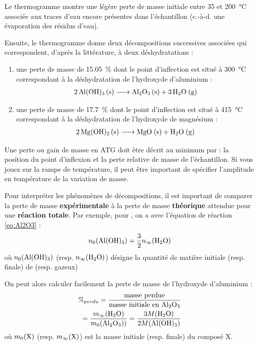 \documentclass[twoside,a4paper,11pt,addpoints,answers]{exam}%
\begin{document}
Le thermogramme montre une légère perte de masse initiale entre 35 et \SI{200}{\celsius} associée aux traces d'eau encore présentes dans l'échantillon (c.-à-d. une évaporation des résidus d'eau).

Ensuite, le thermogramme donne deux décompositions successives associées qui correspondent, d'après la littérature, à deux déshydratations : 
\begin{enumerate}
\item une perte de masse de \SI{15.05}{\percent} dont le point d'inflection est situé à \SI{300}{\celsius} correspondant à la déshydratation de l'hydroxyde d'aluminium : 
\begin{align}
\ce{2 Al(OH)3 (s) -> Al2O3 (s) + 3 H2O (g)} \label{eq:Al2O3}
\end{align}
\item une perte de masse de \SI{17.7}{\percent} dont le point d'inflection est situé à \SI{415}{\celsius} correspondant à la déshydratation de l'hydroxyde de magnésium : 
\begin{align}
\ce{2 Mg(OH)2 (s) -> MgO (s) + H2O (g)} \label{eq:MgO}
\end{align}
\end{enumerate}

Une perte ou gain de masse en ATG doit être décrit au minimum par : la position du point d'inflexion et la perte relative de masse de l'échantillon. Si vous jouez sur la rampe de température, il peut être important de spécifier l'amplitude en température de la variation de masse.

Pour interpréter les phénomènes de décompositions, il est important de comparer la perte de masse \textbf{expérimentale} à la perte de masse \textbf{théorique} attendue pour une \textbf{réaction totale}. Par exemple, pour , on a avec l'équation de réaction \ref{eq:Al2O3} :
\begin{align*}
n_0 ( \ce{Al(OH)3} ) = \frac{3}{2} n_\infty ( \ce{H2O} )
\end{align*}
où $n_0 ( \ce{Al(OH)3} )$ (resp. $n_\infty ( \ce{H2O} )$) désigne la quantité de matière initiale (resp. finale) de  (resp.  gazeux)

On peut alors calculer facilement la perte de masse de l'hydroxyde d'aluminium : 
\begin{align*}
\%_{perdu} = \frac{\text{masse perdue}}{\text{masse initiale en \ce{Al2O3}}} \\
= \frac{m_\infty ( \ce{H2O} )}{m_0 ( \ce{Al2O3} ) )} = \frac{3 M( \ce{H2O} )}{2 M( \ce{Al(OH)3} )}
\end{align*}
où $m_0 ( \ce{X} )$ (resp. $m_\infty ( \ce{X} )$) est la masse initiale (resp. finale) du composé X.
\end{document}

